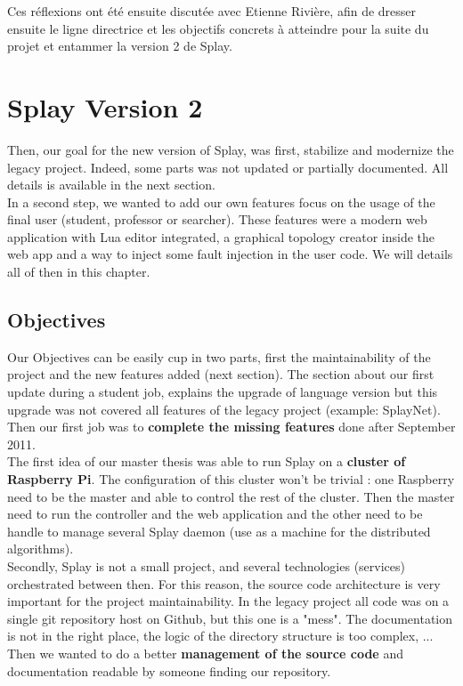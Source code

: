 \documentclass{eplmastersthesis}
\begin{document}
        Ces réflexions ont été ensuite discutée avec Etienne Rivière, afin de
        dresser ensuite le ligne directrice et les objectifs concrets à atteindre
        pour la suite du projet et entammer la version 2 de Splay.

  \chapter{Splay Version 2}

    Then, our goal for the new version of Splay, was first, stabilize and modernize the legacy project. Indeed, some parts was not updated or partially documented. All details is available in the next section.\\

    In a second step, we wanted to add our own features focus on the usage of the final user (student, professor or searcher). These features were a modern web application with Lua editor integrated, a graphical topology creator inside the web app and a way to inject some fault injection in the user code. We will details all of then in this chapter.

    \section{Objectives}

      Our Objectives can be easily cup in two parts, first the maintainability of the project and the new features added (next section). The section about our first update during a student job, explains the upgrade of language version but this upgrade was not covered all features of the legacy project (example: SplayNet). Then our first job was to\textbf{ complete the missing features} done after  September 2011. \\

      The first idea of our master thesis was able to run Splay on a \textbf{cluster of Raspberry Pi}. The configuration of this cluster won't be trivial : one Raspberry need to be the master and able to control the rest of the cluster. Then the master need to run the controller and the web application and the other need to be handle to manage several Splay daemon (use as a machine for the distributed algorithms). \\

      Secondly, Splay is not a small project, and several technologies (services) orchestrated between then. For this reason, the source code architecture is very important for the project maintainability. In the legacy project all code was on a single git repository host on Github, but this one is a "mess". The documentation is not in the right place, the logic of the directory structure is too complex, ... Then we wanted to do a better \textbf{management of the source code} and documentation readable by someone finding our repository. \\
\end{document}
